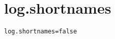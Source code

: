 \section{log.shortnames}
\label{configuration:LogShortnames}
\ClearAPI
\TODO
{}
\begin{lstlisting}[style=Props,caption={Usage example for \textit{log.shortnames}}]
log.shortnames=false
\end{lstlisting}